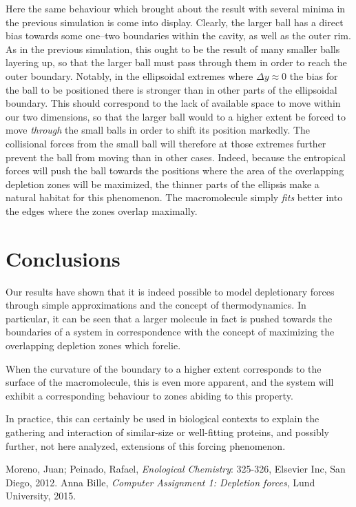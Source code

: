 \documentclass[a4paper,12pt]{article}
\theoremstyle{plain}
\theoremstyle{definition}
\begin{document}
   Here the same behaviour which brought about the result with several minima
   in the previous simulation is come into display. Clearly, the larger ball has
   a direct bias towards some one--two boundaries within the cavity, as well as the
   outer rim. As in the previous simulation, this ought to be the result of many
   smaller balls layering up, so that the larger ball must pass through them in
   order to reach the outer boundary. Notably, in the ellipsoidal extremes where
   $\Delta y \approx 0$ the bias for the ball to be positioned there is stronger 
   than in other parts of the ellipsoidal boundary. This should correspond to
   the lack of available space to move within our two dimensions, so that the
   larger ball would to a higher extent be forced to move \emph{through} the
   small balls in order to shift its position markedly. The collisional forces
   from the small ball will therefore at those extremes further prevent the ball
   from moving than in other cases. Indeed, because the entropical forces will
   push the ball towards the positions where the area of the overlapping
   depletion zones will be maximized, the thinner parts of the ellipsis make a
   natural habitat for this phenomenon. The macromolecule simply \emph{fits}
   better into the edges where the zones overlap maximally.  

\section{Conclusions}
   Our results have shown that it is indeed possible to model depletionary
   forces through simple approximations and the concept of thermodynamics. In
   particular, it can be seen that a larger molecule in fact is pushed towards
   the boundaries of a system in correspondence with the concept of maximizing
   the overlapping depletion zones which forelie. 
   
   When the curvature of the
   boundary to a higher extent corresponds to the surface of the macromolecule,
   this is even more apparent, and the system will exhibit a corresponding
   behaviour to zones abiding to this property. 

   In practice, this can certainly be used in biological contexts to explain the
   gathering and interaction of similar-size or well-fitting proteins, and possibly 
   further, not here analyzed, extensions of this forcing phenomenon. 

\begin{thebibliography}{99}
      Moreno, Juan; Peinado, Rafael, 
      \emph{Enological Chemistry}: 325-326,
      Elsevier Inc, 
      San Diego, 
      2012. 
      Anna Bille,
      \emph{Computer Assignment 1: Depletion forces},
      Lund University,
      2015.  
\end{thebibliography}
\end{document}
